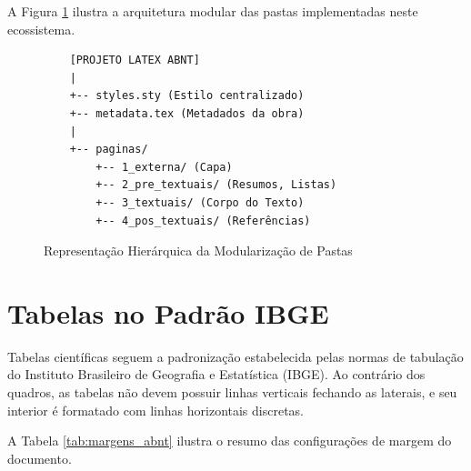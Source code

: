 A Figura \ref{fig:exemplo_estrutura} ilustra a arquitetura modular das pastas implementadas neste ecossistema.

\begin{figure}[h!]
  \centering
  \caption{Representação Hierárquica da Modularização de Pastas}
  \label{fig:exemplo_estrutura}
  
  \begin{minipage}{8cm}
    \centering
    \small
    \begin{verbatim}
    [PROJETO LATEX ABNT]
    |
    +-- styles.sty (Estilo centralizado)
    +-- metadata.tex (Metadados da obra)
    |
    +-- paginas/
        +-- 1_externa/ (Capa)
        +-- 2_pre_textuais/ (Resumos, Listas)
        +-- 3_textuais/ (Corpo do Texto)
        +-- 4_pos_textuais/ (Referências)
    \end{verbatim}
  \end{minipage}
  
\end{figure}

\section{Tabelas no Padrão IBGE}

Tabelas científicas seguem a padronização estabelecida pelas normas de tabulação do Instituto Brasileiro de Geografia e Estatística (IBGE). Ao contrário dos quadros, as tabelas não devem possuir linhas verticais fechando as laterais, e seu interior é formatado com linhas horizontais discretas.

A Tabela \ref{tab:margens_abnt} ilustra o resumo das configurações de margem do documento.

